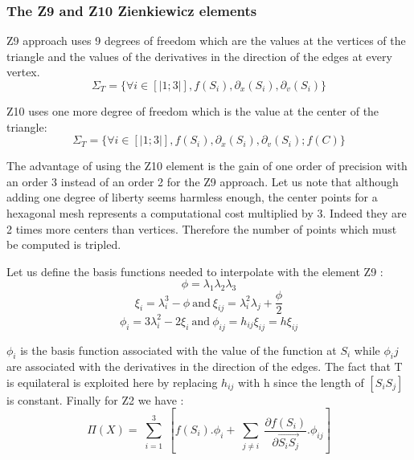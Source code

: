 \documentclass[proc]{edpsmath}
\begin{document}
\subsubsection{The Z9 and Z10 Zienkiewicz elements}
Z9 approach uses 9 degrees of freedom which are the values at the vertices of the triangle and the values of the derivatives in the direction of the edges at every vertex.
\begin{equation*}
 \Sigma_T = \lbrace \forall i \in [|1;3|], f(S_i),\partial_x(S_i),\partial_v(S_i) \rbrace 
\end{equation*}

 \noindent Z10 uses one more degree of freedom which is the value at the center of the triangle:
\begin{equation*}
 \Sigma_T = \lbrace \forall i \in [|1;3|], f(S_i),\partial_x(S_i),\partial_v(S_i); f(C) \rbrace 
\end{equation*}

 \noindent The advantage of using the Z10 element is the gain of one order of precision with an order 3 instead of an order 2 for the Z9 approach. Let us note that although adding one degree of liberty seems harmless enough, the center points for a hexagonal mesh represents a computational cost multiplied by 3. Indeed they are  2 times more centers than vertices. Therefore the number of points which must be computed is tripled. 
 
Let us define the basis functions needed to interpolate with the element Z9 : 
\begin{equation*}
\phi = \lambda_1 \lambda_2 \lambda_3 
\end{equation*}
\begin{equation*}
\xi _i= \lambda_i^3 - \phi ~\text{and}~ \xi_{ij}= \lambda_{i}^2 \lambda_j + \frac{\phi}{2} 
\end{equation*}
\begin{equation*}
\phi_i = 3\lambda_{i}^2 -2 \xi_i ~\text{and} ~\phi_{ij} = h_{ij} \xi_{ij}=h \xi_{ij}
\end{equation*}


\noindent $\phi_i$ is the basis function associated with the value of the function at $S_i$ while $\phi_ij$ are associated with the derivatives in the direction of the edges.    
The fact that T is equilateral is exploited here by replacing $h_{ij}$ with h since the length of $ [S_iS_j]$ is constant. Finally for Z2 we have :
\begin{equation*}
 \Pi (X) = \sum \limits_{\substack{i=1 }}^{3}{ [f(S_i).\phi_i + \sum \limits_{\substack{j\neq i }}^{}{ \frac{\partial f(S_i)}{\partial  \overrightarrow{ S_i S_j } }.\phi_{ij} } ] } 
\end{equation*}
\end{document}
